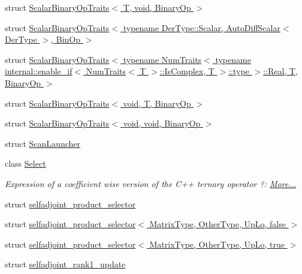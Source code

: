\begin{DoxyCompactItemize}
\item 
struct \hyperlink{struct_eigen_1_1_scalar_binary_op_traits_3_01_t_00_01void_00_01_binary_op_01_4}{Scalar\+Binary\+Op\+Traits$<$ T, void, Binary\+Op $>$}
\item 
struct \hyperlink{struct_eigen_1_1_scalar_binary_op_traits_3_01typename_01_der_type_1_1_scalar_00_01_auto_diff_sca5c26207d328bbaa3069a04f38248d36b}{Scalar\+Binary\+Op\+Traits$<$ typename Der\+Type\+::\+Scalar, Auto\+Diff\+Scalar$<$ Der\+Type $>$, Bin\+Op $>$}
\item 
struct \hyperlink{struct_eigen_1_1_scalar_binary_op_traits_3_01typename_01_num_traits_3_01typename_01internal_1_1e682c29bad5c4221eece44bbf2be041d0}{Scalar\+Binary\+Op\+Traits$<$ typename Num\+Traits$<$ typename internal\+::enable\+\_\+if$<$ Num\+Traits$<$ T $>$\+::\+Is\+Complex, T $>$\+::type $>$\+::\+Real, T, Binary\+Op $>$}
\item 
struct \hyperlink{struct_eigen_1_1_scalar_binary_op_traits_3_01void_00_01_t_00_01_binary_op_01_4}{Scalar\+Binary\+Op\+Traits$<$ void, T, Binary\+Op $>$}
\item 
struct \hyperlink{struct_eigen_1_1_scalar_binary_op_traits_3_01void_00_01void_00_01_binary_op_01_4}{Scalar\+Binary\+Op\+Traits$<$ void, void, Binary\+Op $>$}
\item 
struct \hyperlink{struct_eigen_1_1_scan_launcher}{Scan\+Launcher}
\item 
class \hyperlink{group___core___module_class_eigen_1_1_select}{Select}
\begin{DoxyCompactList}\small\item\em Expression of a coefficient wise version of the C++ ternary operator ?\+:  \hyperlink{group___core___module_class_eigen_1_1_select}{More...}\end{DoxyCompactList}\item 
struct \hyperlink{struct_eigen_1_1selfadjoint__product__selector}{selfadjoint\+\_\+product\+\_\+selector}
\item 
struct \hyperlink{struct_eigen_1_1selfadjoint__product__selector_3_01_matrix_type_00_01_other_type_00_01_up_lo_00_01false_01_4}{selfadjoint\+\_\+product\+\_\+selector$<$ Matrix\+Type, Other\+Type, Up\+Lo, false $>$}
\item 
struct \hyperlink{struct_eigen_1_1selfadjoint__product__selector_3_01_matrix_type_00_01_other_type_00_01_up_lo_00_01true_01_4}{selfadjoint\+\_\+product\+\_\+selector$<$ Matrix\+Type, Other\+Type, Up\+Lo, true $>$}
\item 
struct \hyperlink{struct_eigen_1_1selfadjoint__rank1__update}{selfadjoint\+\_\+rank1\+\_\+update}

\end{DoxyCompactItemize}

